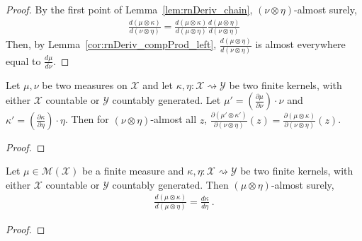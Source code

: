 \begin{proof}\mathlibok
{}
By the first point of Lemma~\ref{lem:rnDeriv_chain}, $(\nu \otimes \eta)$-almost surely,
\begin{align*}
\frac{d(\mu \otimes \kappa)}{d(\nu \otimes \eta)}
  = \frac{d(\mu \otimes \kappa)}{d(\mu \otimes \eta)} \frac{d (\mu \otimes \eta)}{d (\nu \otimes \eta)} 
\end{align*}
Then, by Lemma~\ref{cor:rnDeriv_compProd_left}, $\frac{d (\mu \otimes \eta)}{d (\nu \otimes \eta)}$ is almost everywhere equal to $\frac{d\mu}{d\nu}$.
\end{proof}


\begin{lemma}
  \label{lem:rnDeriv_eq_ac}
  Let $\mu, \nu$ be two measures on $\mathcal X$ and let $\kappa, \eta : \mathcal X \rightsquigarrow \mathcal Y$ be two finite kernels, with either $\mathcal X$ countable or $\mathcal{Y}$ countably generated.
  Let $\mu' = \left(\frac{\partial \mu}{\partial \nu}\right) \cdot \nu$ and $\kappa' = \left(\frac{\partial \kappa}{\partial \eta}\right) \cdot \eta$.
  Then for $(\nu \otimes \eta)$-almost all $z$, $\frac{\partial(\mu' \otimes \kappa')}{\partial (\nu \otimes \eta)}(z) = \frac{\partial(\mu \otimes \kappa)}{\partial (\nu \otimes \eta)}(z)$.
\end{lemma}

\begin{proof} %
\end{proof}


\begin{lemma}
  \label{cor:rnDeriv_compProd_right}
  \mathlibok
  Let $\mu \in \mathcal M(\mathcal X)$ be a finite measure and $\kappa, \eta : \mathcal X \rightsquigarrow \mathcal Y$ be two finite kernels, with either $\mathcal X$ countable or $\mathcal{Y}$ countably generated.
  Then $(\mu \otimes \eta)$-almost surely,
  \begin{align*}
  \frac{d (\mu \otimes \kappa)}{d (\mu \otimes \eta)} = \frac{d \kappa}{d \eta}
  \: .
  \end{align*}
\end{lemma}

\begin{proof}\mathlibok
{}

\end{proof}

